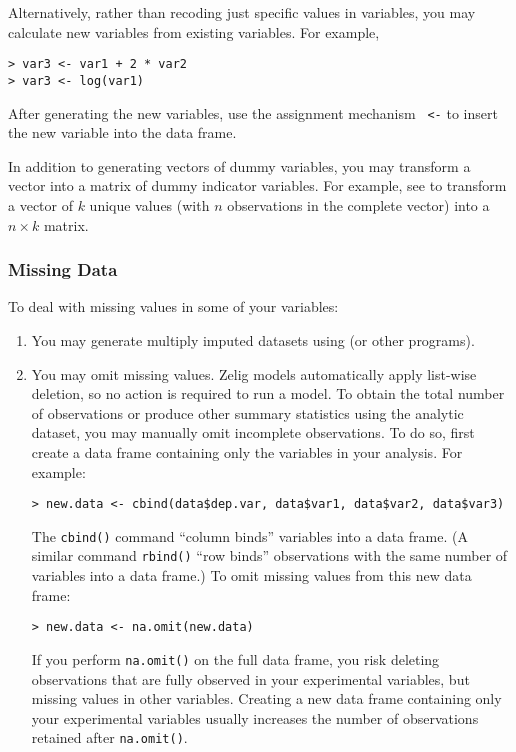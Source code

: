 Alternatively, rather than recoding just specific values in variables,
you may calculate new variables from existing variables.  For example,
\begin{verbatim}
> var3 <- var1 + 2 * var2   
> var3 <- log(var1)         
\end{verbatim}
After generating the new variables, use the assignment mechanism {\tt
  <-} to insert the new variable into the data frame.

In addition to generating vectors of dummy variables, you may
transform a vector into a matrix of dummy indicator variables.  For
example, see  to transform a vector of $k$ unique values
(with $n$ observations in the complete vector) into a $n \times k$
matrix.

\subsubsection*{Missing Data} 

To deal with missing values in some of your variables:
\begin{enumerate}
\item You may generate multiply imputed datasets using
   (or
  other programs).
\item You may omit missing values.  Zelig models automatically apply
  list-wise deletion, so no action is required to run a model.  To
  obtain the total number of observations or produce other summary
  statistics using the analytic dataset, you may manually omit
  incomplete observations.  To do so, first create a data frame
  containing only the variables in your analysis.  For example:
\begin{verbatim}
> new.data <- cbind(data$dep.var, data$var1, data$var2, data$var3)
\end{verbatim}
  The {\tt cbind()} command ``column binds'' variables into a data
  frame.  (A similar command {\tt rbind()} ``row binds'' observations
  with the same number of variables into a data frame.)  To omit
  missing values from this new data frame:
\begin{verbatim}
> new.data <- na.omit(new.data)
\end{verbatim}
  If you perform {\tt na.omit()} on the full data frame, you risk
  deleting observations that are fully observed in your experimental
  variables, but missing values in other variables.  Creating a new
  data frame containing only your experimental variables usually
  increases the number of observations retained after {\tt na.omit()}.
\end{enumerate}

